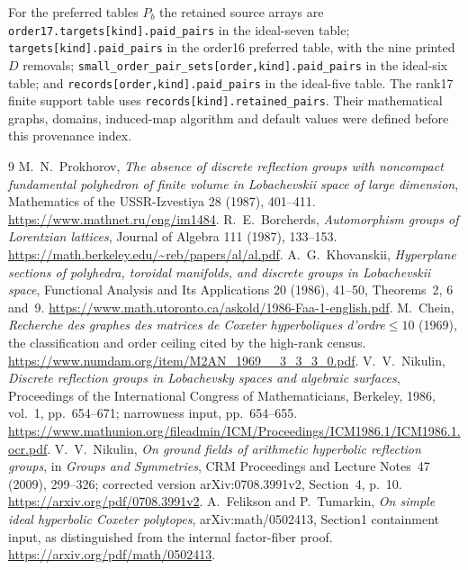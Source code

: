 \documentclass[11pt]{article}
\theoremstyle{remark}\newtheorem{remark}[theorem]{Remark}
\newcommand{\cert}[1]{\nolinkurl{#1}}
\begin{document}
For the preferred tables $P_b$ the retained source arrays are
\cert{order17.targets[kind].paid_pairs} in the ideal-seven table;
\cert{targets[kind].paid_pairs} in the order16 preferred table, with
the nine printed$D$ removals; \cert{small_order_pair_sets[order,kind].paid_pairs}
in the ideal-six table; and \cert{records[order,kind].paid_pairs}
in the ideal-five table. The rank17 finite support table uses
\cert{records[kind].retained_pairs}. Their mathematical graphs,
domains, induced-map algorithm and default values were defined
before this provenance index.

\begin{thebibliography}{9}
 M.~N.~Prokhorov,
\emph{The absence of discrete reflection groups with noncompact
fundamental polyhedron of finite volume in Lobachevskii space of
large dimension}, Mathematics of the USSR-Izvestiya 28 (1987),
401--411.
\url{https://www.mathnet.ru/eng/im1484}.
 R.~E.~Borcherds,
\emph{Automorphism groups of Lorentzian lattices}, Journal of Algebra
111 (1987), 133--153.
\url{https://math.berkeley.edu/~reb/papers/al/al.pdf}.
 A.~G.~Khovanskii,
\emph{Hyperplane sections of polyhedra, toroidal manifolds, and discrete
groups in Lobachevskii space}, Functional Analysis and Its Applications
20 (1986), 41--50, Theorems~2, 6 and~9.
\url{https://www.math.utoronto.ca/askold/1986-Faa-1-english.pdf}.
 M.~Chein,
\emph{Recherche des graphes des matrices de Coxeter hyperboliques
d'ordre$\le10$} (1969), the classification and order ceiling cited by
the high-rank census.
\url{https://www.numdam.org/item/M2AN_1969__3_3_3_0.pdf}.
 V.~V.~Nikulin,
\emph{Discrete reflection groups in Lobachevsky spaces and algebraic
surfaces}, Proceedings of the International Congress of Mathematicians,
Berkeley, 1986, vol.~1, pp.~654--671; narrowness input, pp.~654--655.
\url{https://www.mathunion.org/fileadmin/ICM/Proceedings/ICM1986.1/ICM1986.1.ocr.pdf}.
 V.~V.~Nikulin,
\emph{On ground fields of arithmetic hyperbolic reflection groups},
in \emph{Groups and Symmetries}, CRM Proceedings and Lecture Notes~47
(2009), 299--326; corrected version arXiv:0708.3991v2,
Section~4, p.~10.
\url{https://arxiv.org/pdf/0708.3991v2}.
 A.~Felikson and P.~Tumarkin,
\emph{On simple ideal hyperbolic Coxeter polytopes}, arXiv:math/0502413,
Section1 containment input, as distinguished from the internal
factor-fiber proof.
\url{https://arxiv.org/pdf/math/0502413}.
\end{thebibliography}
\end{document}
